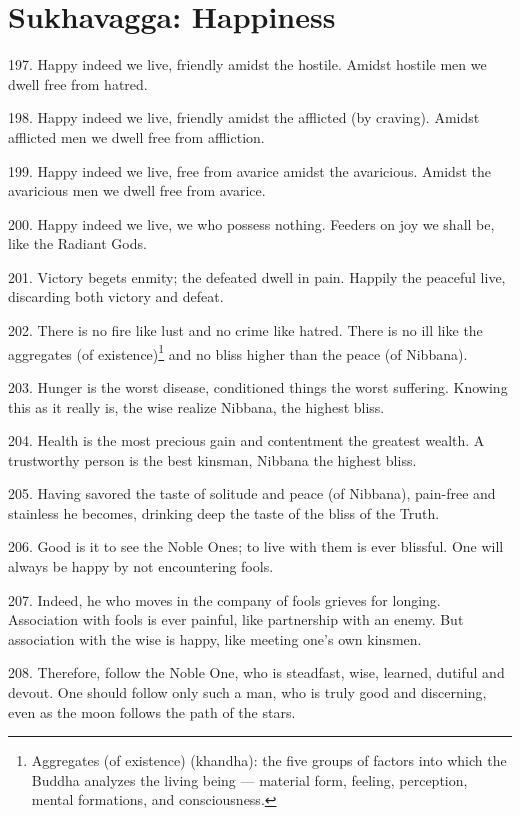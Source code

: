 \newpage
\chapter{Sukhavagga: Happiness}
197. Happy indeed we live, friendly amidst the hostile. Amidst hostile men we dwell free from hatred.

198. Happy indeed we live, friendly amidst the afflicted (by craving). Amidst afflicted men we dwell free from affliction.

199. Happy indeed we live, free from avarice amidst the avaricious. Amidst the avaricious men we dwell free from avarice.

200. Happy indeed we live, we who possess nothing. Feeders on joy we shall be, like the Radiant Gods.

201. Victory begets enmity; the defeated dwell in pain. Happily the peaceful live, discarding both victory and defeat.

202. There is no fire like lust and no crime like hatred. There is no ill like the aggregates (of existence)\footnote{Aggregates (of existence) (khandha): the five groups of factors into which the Buddha analyzes the living being — material form, feeling, perception, mental formations, and consciousness.} and no bliss higher than the peace (of Nibbana).

203. Hunger is the worst disease, conditioned things the worst suffering. Knowing this as it really is, the wise realize Nibbana, the highest bliss.

204. Health is the most precious gain and contentment the greatest wealth. A trustworthy person is the best kinsman, Nibbana the highest bliss.

205. Having savored the taste of solitude and peace (of Nibbana), pain-free and stainless he becomes, drinking deep the taste of the bliss of the Truth.

206. Good is it to see the Noble Ones; to live with them is ever blissful. One will always be happy by not encountering fools.

207. Indeed, he who moves in the company of fools grieves for longing. Association with fools is ever painful, like partnership with an enemy. But association with the wise is happy, like meeting one's own kinsmen.

208. Therefore, follow the Noble One, who is steadfast, wise, learned, dutiful and devout. One should follow only such a man, who is truly good and discerning, even as the moon follows the path of the stars.
